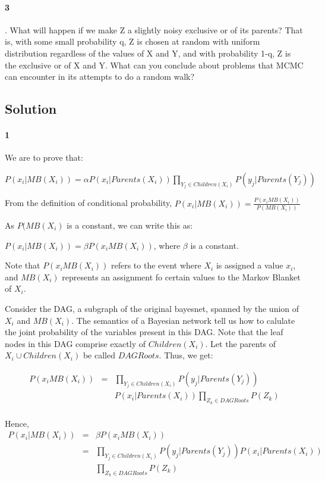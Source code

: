 \documentclass[10pt]{article}
\begin{document}
   \paragraph{3}. What will happen if we make Z a slightly noisy exclusive or of its parents? That is, with some small probability q, Z is chosen at random with uniform distribution regardless of the values of X and Y, and with probability 1-q, Z is the exclusive or of X and Y. What can you conclude about problems that MCMC can encounter in its attempts to do a random walk? 

\subsection{Solution}

\paragraph{1} We are to prove that:

$P(x_{i}|MB(X_{i}))=\alpha P(x_{i}|Parents(X_{i}))\prod_{Y_{j}\in Children(X_{i})} P(y_{j}|Parents(Y_{j}))$

From the definition of conditional probability, $P(x_{i}|MB(X_{i}))=\frac{P(x_{i}MB(X_{i}))}{P(MB(X_{i}))}$

As $P(MB(X_{i})$ is a constant, we can write this as: 

$P(x_{i}|MB(X_{i}))=\beta P(x_{i}MB(X_{i}))$, where $\beta$ is a constant.

Note that $P(x_{i}MB(X_{i}))$ refers to the event where $X_{i}$ is assigned a value $x_{i}$, and $MB(X_{i})$ represents an assignment fo certain values to the Markov Blanket of $X_{i}$.

Consider the DAG, a subgraph of the original bayesnet, spanned by the union of $X_{i}$ and $MB(X_{i})$. The semantics of a Bayesian network tell us how to calulate the joint probability of the variables present in this DAG. Note that the leaf nodes in this DAG comprise exactly of $Children(X_{i})$. Let the parents of $X_{i}\cup Children(X_{i})$ be called $DAGRoots$. Thus, we get:

\begin{eqnarray}
P(x_{i}MB(X_{i}))  & =  & \prod_{Y_{j}\in Children(X_{i})} P(y_{j}|Parents(Y_{j})) \nonumber \\
& & P(x_{i}|Parents(X_{i})) \prod_{Z_{k}\in DAGRoots}P(Z_{k})\\
\end{eqnarray}

Hence, 
\begin{eqnarray}
P(x_{i}|MB(X_{i})) & = & \beta P(x_{i}MB(X_{i}))\\
 & = & \prod_{Y_{j}\in Children(X_{i})} P(y_{j}|Parents(Y_{j})) P(x_{i}|Parents(X_{i}))\\
& & \prod_{Z_{k}\in DAGRoots}P(Z_{k})
\end{eqnarray}
\end{document}
